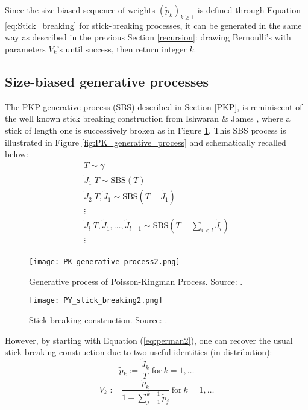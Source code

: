 Since the size-biased sequence of weights $(\tilde{p}_k)_{k \ge 1}$ is defined through Equation \ref{eq:Stick_breaking} for stick-breaking processes, it can be generated in the same way as described in the previous Section \ref{recursion}: drawing Bernoulli's with parameters $V_k$'s until success, then return integer $k$.

\subsection{Size-biased generative processes}

The \gls{PKP} generative process (\acrlong{SBS}) described in Section \ref{PKP}, is reminiscent of the well known stick breaking construction from Ishwaran \& James \cite{Ishwaran:2001dw}, where a stick of length one is successively broken as in Figure \ref{fig:PY_stick_breaking}.
This \gls{SBS} process is illustrated in Figure \ref{fig:PK_generative_process} and schematically recalled below:
\begin{gather*}
T \sim \gamma \\
\tilde{J}_1|T \sim \text{SBS}(T) \\
\tilde{J}_2|T,\tilde{J}_1 \sim \text{SBS}(T - \tilde{J}_1) \\
\vdots \\
\tilde{J}_{l}|T,\tilde{J}_1,\dots,\tilde{J}_{l-1} \sim \text{SBS}(T - \sum_{i<l} \tilde{J}_i) \\
\vdots \\
\end{gather*}
\begin{figure}[h!]
  \centering
  \begin{minipage}[b]{0.48\textwidth}
    \texttt{[image: PK\_generative\_process2.png]}
    \caption{Generative process of Poisson-Kingman Process. Source: \cite{LomeliThesis}.}
    \label{fig:PK_generative_process}
  \end{minipage}
  \hfill
  \begin{minipage}[b]{0.48\textwidth}
    \texttt{[image: PY\_stick\_breaking2.png]}
    \caption{Stick-breaking construction. Source: \cite{LomeliThesis}.}
    \label{fig:PY_stick_breaking}
  \end{minipage}
\end{figure}
However, by starting with Equation (\ref{eq:perman2}), one can recover the usual stick-breaking construction due to two useful identities (in distribution):
\begin{equation} \label{eq:SBS1}
\tilde{p}_k := \frac{\tilde{J}_k}{T} \ \text{for} \ k=1,\dots
\end{equation}
\begin{equation} \label{eq:SBS2}
V_k := \frac{\tilde{p}_k}{1 - \sum_{j=1}^{k-1}{\tilde{p}_j}} \ \text{for} \ k=1,\dots
\end{equation}

